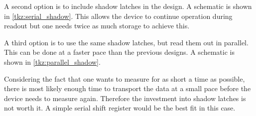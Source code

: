 A second option is to include shadow latches in the design. A schematic is shown in \cref{tkz:serial_shadow}. This allows the device to continue operation during readout but one needs twice as much storage to achieve this.



A third option is to use the same shadow latches, but read them out in parallel. This can be done at a faster pace than the previous designs. A schematic is shown in \cref{tkz:parallel_shadow}. 



Considering the fact that one wants to measure for as short a time as possible, there is most likely enough time to transport the data at a small pace before the device needs to measure again. Therefore the investment into shadow latches is not worth it. A simple serial shift register would be the best fit in this case.



